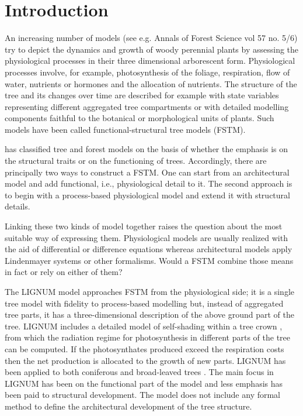\section{Introduction} 

An increasing number of models  (see e.g. Annals of Forest Science vol
57 no.  5/6) try to depict  the dynamics and growth of woody perennial
plants  by  assessing  the  physiological  processes  in  their  three
dimensional  arborescent form.   Physiological processes  involve, for
example, photosynthesis  of the  foliage, respiration, flow  of water,
nutrients or hormones and  the allocation of nutrients.  The structure
of the tree  and its changes over time are  described for example with
state variables representing different aggregated tree compartments or
with  detailed  modelling  components  faithful to  the  botanical  or
morphological  units   of  plants.   Such  models   have  been  called
functional-structural tree models (FSTM).

\citet{kurth:94b} has  classified tree and forest models  on the basis
of  whether  the  emphasis is  on  the  structural  traits or  on  the
functioning of trees.  Accordingly,  there are principally two ways to
construct  a  FSTM.   One   can  start  from  an  architectural  model
\citep{jaeger:92,  kurth:94} and  add functional,  i.e., physiological
detail to  it.  The second approach  is to begin with  a process-based
physiological  model \citep{makela:86, landsberg:86,  sievanen:93} and
extend it with structural details.

Linking these  two kinds of  model together raises the  question about
the  most suitable way  of expressing  them. Physiological  models are
usually realized with the  aid of differential or difference equations
\citep{landsberg:86}  whereas architectural  models  apply Lindenmayer
systems  \citep{kurth:99,pp:90}  or  other  formalisms. Would  a  FSTM
combine those means in fact or rely on either of them?

The LIGNUM model approaches FSTM  from the physiological side; it is a
single tree model  \citep{perttunen:96} with fidelity to process-based
modelling  \citep[see  e.g.][]{nikinmaa:92, sievanen:93,  makela:97-1}
but,  instead of  aggregated tree  parts, it  has  a three-dimensional
description of the  above ground part of the  tree.  LIGNUM includes a
detailed    model    of    self-shading    within   a    tree    crown
\citep{perttunen:96,  perttunen:01}, from  which the  radiation regime
for photosynthesis in different parts of the tree can be computed.  If
the photosynthates produced exceed  the respiration costs then the net
production is allocated  to the growth of new  parts.  LIGNUM has been
applied to both coniferous \citep{perttunen:96,lo:99} and broad-leaved
trees \citep{perttunen:01}.  The main focus  in LIGNUM has been on the
functional  part of  the  model and  less  emphasis has  been paid  to
structural development.  The model  does not include any formal method
to define the architectural development of the tree structure.

